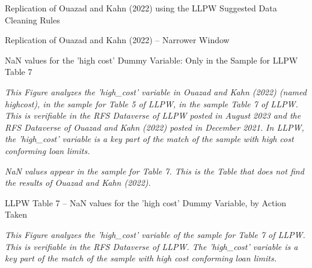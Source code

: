 \documentclass{article}
\begin{document}
\begin{table}

\caption{Replication of Ouazad and Kahn (2022) using the LLPW Suggested Data Cleaning Rules}

\begin{center}

\end{center}

\end{table}

\clearpage
\pagebreak

\begin{table}

\caption{Replication of Ouazad and Kahn (2022) – Narrower Window}


\begin{center}

\end{center}

\end{table}

\clearpage
\pagebreak

\begin{table}

\caption{NaN values for the 'high cost' Dummy Variable: Only in the Sample for LLPW Table 7}

\emph{This Figure analyzes the 'high\_cost' variable in Ouazad and Kahn (2022) (named highcost), in the sample for Table 5 of LLPW, in the sample Table 7 of LLPW. This is verifiable in the RFS Dataverse of LLPW posted in August 2023 and the RFS Dataverse of Ouazad and Kahn (2022) posted in December 2021. In LLPW, the 'high\_cost' variable is a key part of the match of the sample with high cost conforming loan limits.}

\begin{center}

\end{center}

\emph{NaN values appear in the sample for Table 7. This is the Table that does not find the results of Ouazad and Kahn (2022).}

\end{table}

\begin{table}
\caption{LLPW Table 7 -- NaN values for the 'high cost' Dummy Variable, by Action Taken}

\emph{This Figure analyzes the 'high\_cost' variable of the sample for Table 7 of LLPW. This is verifiable in the RFS Dataverse of LLPW. The 'high\_cost' variable is a key part of the match of the sample with high cost conforming loan limits.}

\begin{center}

\end{center}

\end{table}
\end{document}
